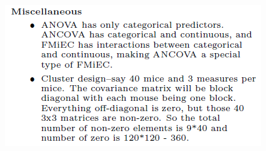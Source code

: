 \documentclass[10pt,landscape]{article}
\begin{document}
\begin{multicols*}{4}
\includegraphics[scale=.6]{fig/misc.png}\\
\end{multicols*} 
\end{document}
